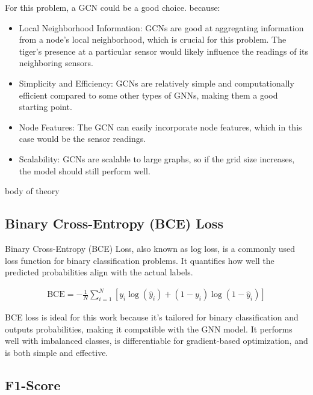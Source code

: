 \documentclass{article}
\begin{document}
For this problem, a GCN could be a good choice. because:

  \begin{itemize}
    \item Local Neighborhood Information: GCNs are good at aggregating information from a node's local neighborhood, which is crucial for this problem. The tiger's presence at a particular sensor would likely influence the readings of its neighboring sensors.
  
    \item Simplicity and Efficiency: GCNs are relatively simple and computationally efficient compared to some other types of GNNs, making them a good starting point.
  
    \item Node Features: The GCN can easily incorporate node features, which in this case would be the sensor readings.
  
    \item Scalability: GCNs are scalable to large graphs, so if the grid size increases, the model should still perform well.
  \end{itemize}

body of theory \cite{gretton2012kernel}

\subsection{Binary Cross-Entropy (BCE) Loss}
\label{ssec:bce}

Binary Cross-Entropy (BCE) Loss, also known as log loss, is a commonly used loss function for binary classification problems. It quantifies how well the predicted probabilities align with the actual labels.

\begin{align}
  \text{BCE} = -\frac{1}{N} \sum_{i=1}^{N} [y_i \log(\hat{y}_i) + (1 - y_i) \log(1 - \hat{y}_i)]
\end{align}

BCE loss is ideal for this work because it's tailored for binary classification and outputs probabilities, making it compatible with the GNN model. It performs well with imbalanced classes, is differentiable for gradient-based optimization, and is both simple and effective.

\subsection{F1-Score}
\label{ssec:f1}
\end{document}
